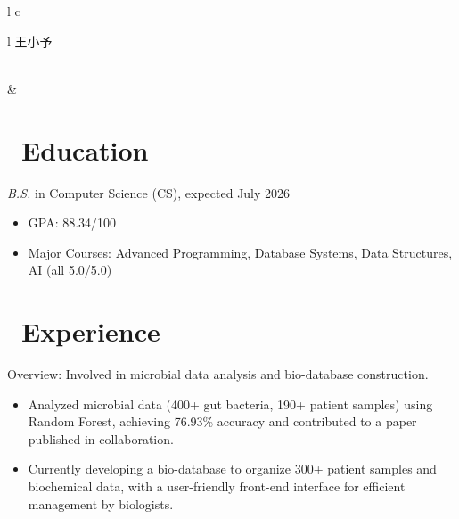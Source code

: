 \documentclass{resume}
\begin{document}


{
\Large{
  \begin{tabu}{l c }
    \begin{tabu}{ l }
      \scshape{王小予} \\ %
       \textperiodcentered\ 
       \textperiodcentered\ 
    \end{tabu}
    &
  \end{tabu}
}
}


\section{\faGraduationCap\ Education}
\textit{B.S.} in Computer Science (CS), expected July 2026
\begin{itemize}
  \item GPA: 88.34/100
  \item Major Courses: Advanced Programming, Database Systems, Data Structures, AI (all 5.0/5.0)
\end{itemize}

\section{\faUsers\ Experience}
Overview: Involved in microbial data analysis and bio-database construction.
\begin{itemize}
  \item Analyzed microbial data (400+ gut bacteria, 190+ patient samples) using Random Forest, achieving 76.93\% accuracy and contributed to a paper published in collaboration.  
  \item Currently developing a bio-database to organize 300+ patient samples and biochemical data, with a user-friendly front-end interface for efficient management by biologists.
\end{itemize}
\end{document}

